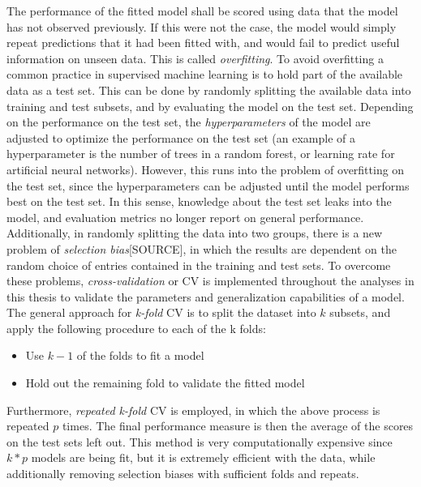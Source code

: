 \documentclass[a4paper, twoside, final, 12pt]{article}
\begin{document}
The performance of the fitted model shall be scored using data that the model has not observed previously.
If this were not the case, the model would simply repeat predictions that  it had been fitted with, and would fail to predict useful information on  unseen data.
This is called \textit{overfitting}. To avoid overfitting a common practice in supervised machine learning is to hold part of the available data as a test set.
This can be done by randomly splitting the available data into training and test subsets, and by evaluating the model on the test set.
Depending on the performance on the test set, the \textit{hyperparameters} of the model are adjusted to optimize the performance on the test set  (an example of a hyperparameter is the number of trees in a random forest, or learning rate for artificial neural networks).
However, this runs into the problem of overfitting on the test set, since the hyperparameters can be adjusted until the model performs best on the test set.
In this sense, knowledge about the test set leaks into the model, and evaluation metrics no longer report on general performance.
Additionally, in randomly splitting the data into two groups, there is a new problem of \textit{selection bias}[SOURCE], in which the results are dependent on the random choice of entries contained in the training and test sets.
To overcome these problems, \textit{cross-validation} or CV is implemented throughout the analyses in this thesis to validate the parameters and generalization capabilities of a model.
The general approach for \textit{k-fold} CV is to split the dataset into $k$ subsets, and apply the following procedure to each of the k folds:
\begin{itemize}
	\item Use $k-1$ of the folds to fit a model 
	\item Hold out the remaining fold to validate the fitted model
\end{itemize}
Furthermore, \textit{repeated k-fold} CV is employed, in which the above process is repeated $p$ times.
The final performance measure is then the average of the scores on the test sets left out.
This method is very computationally expensive since $k*p$ models are being fit, but it is extremely efficient with the data, while additionally removing selection biases with sufficient folds and repeats.
\end{document}
